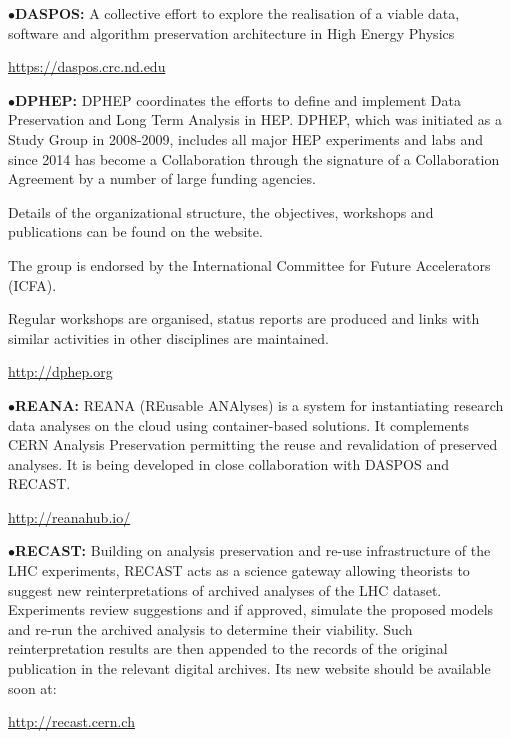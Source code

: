 \medskip

\item{$\bullet$}{\bf DASPOS:}
A collective effort to explore the realisation of a viable data, software and algorithm preservation architecture in High Energy Physics
	\item{}\qquad\url{https://daspos.crc.nd.edu}


\medskip

\item{$\bullet$}{\bf DPHEP:}
DPHEP coordinates the efforts to define and implement Data Preservation and Long Term Analysis in HEP. DPHEP, which was initiated as a Study Group in 2008-2009, includes all major HEP experiments and labs and since 2014 has become a Collaboration through the signature of a Collaboration Agreement by a number of large funding agencies.

\item{}Details of the organizational structure, the objectives, workshops and publications can be found on the website.

\item{}The group is endorsed by the International Committee for Future Accelerators (ICFA).

\item{}Regular workshops are organised, status reports are produced and links with similar activities in other disciplines are maintained.

	\item{}\qquad\url{http://dphep.org}

\medskip

\item{$\bullet$}{\bf REANA:}
REANA (REusable ANAlyses) is a system for instantiating research data analyses on the cloud using container-based solutions. It complements CERN Analysis Preservation permitting the reuse and revalidation of preserved analyses. It is being developed in close collaboration with DASPOS and RECAST.
	\item{}\qquad\url{http://reanahub.io/}


\medskip

\item{$\bullet$}{\bf RECAST:}
Building on analysis preservation and re-use infrastructure of the LHC experiments, RECAST acts as a science gateway allowing theorists to suggest new reinterpretations of archived analyses of the LHC dataset. Experiments review suggestions and if approved, simulate the proposed models and re-run the archived analysis to determine their viability. Such reinterpretation results are then appended to the records of the original publication in the relevant digital archives.
Its new website should be available soon at:
	\item{}\qquad\url{http://recast.cern.ch}


